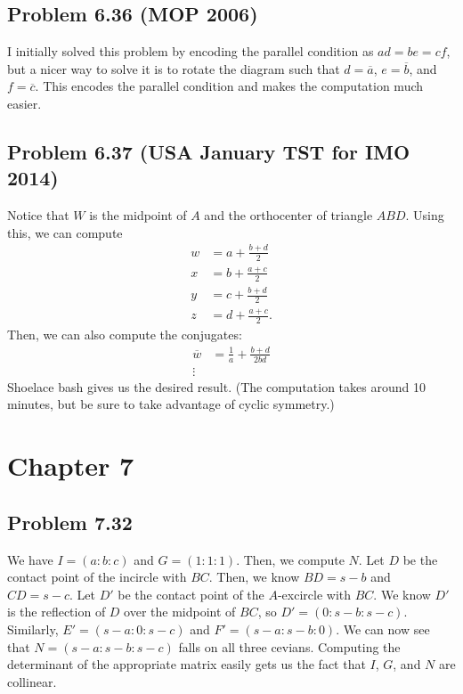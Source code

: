 \documentclass{scrartcl}
\begin{document}
\subsection*{Problem 6.36 (MOP 2006)}
I initially solved this problem by encoding the parallel condition as $ad = be = cf$, but a nicer way to solve it is to rotate the diagram such that $d = \overline{a}$, $e = \overline{b}$, and $f = \overline{c}$. This encodes the parallel condition and makes the computation much easier.

\subsection*{Problem 6.37 (USA January TST for IMO 2014)}
Notice that $W$ is the midpoint of $A$ and the orthocenter of triangle $ABD$. Using this, we can compute
\begin{align*}
    w &= a + \frac{b + d}{2} \\
    x &= b + \frac{a + c}{2} \\
    y &= c + \frac{b + d}{2} \\
    z &= d + \frac{a + c}{2}.
\end{align*}
Then, we can also compute the conjugates:
\begin{align*}
    \overline{w} &= \frac{1}{a} + \frac{b + d}{2bd} \\
    \vdots
\end{align*}
Shoelace bash gives us the desired result. (The computation takes around 10 minutes, but be sure to take advantage of cyclic symmetry.)

\section*{Chapter 7}
\subsection*{Problem 7.32}
We have $I = (a:b:c)$ and $G = (1:1:1)$. Then, we compute $N$.
Let $D$ be the contact point of the incircle with $BC$. Then, we know $BD = s - b$ and $CD = s - c$.
Let $D'$ be the contact point of the $A$-excircle with $BC$. We know $D'$ is the reflection of $D$ over
the midpoint of $BC$, so $D' = (0 : s-b : s-c)$.
Similarly, $E' = (s-a : 0 : s-c)$ and $F' = (s-a : s-b : 0)$.
We can now see that $N = (s-a : s-b : s-c)$ falls on all three cevians.
Computing the determinant of the appropriate matrix easily gets us the fact that $I$, $G$, and $N$ are collinear.
\end{document}
